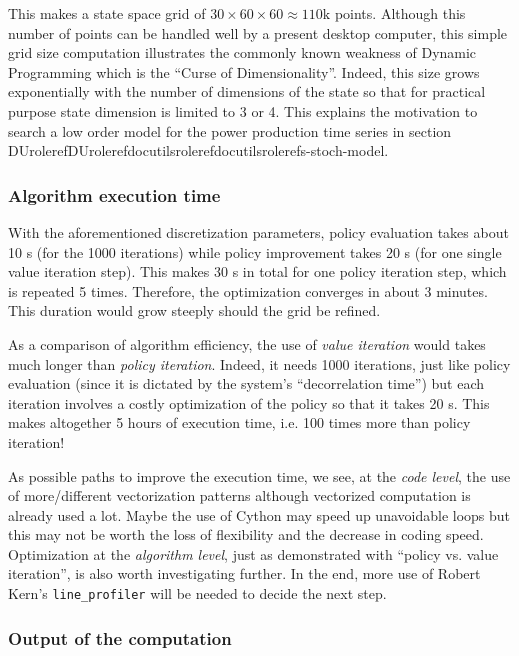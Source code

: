 \documentclass[letterpaper,compsoc,twoside]{IEEEtran}
\providecommand*{\DUrole}[2]{\ifcsname DUrole#1\endcsname \csname DUrole#1\endcsname{#2}\else \ifcsname docutilsrole#1\endcsname \csname docutilsrole#1\endcsname{#2}\else #2\fi \fi }
\begin{document}
This makes a state space grid of
$30\times 60 \times 60 \approx 110\text{k}$ points. Although this
number of points can be handled well by a present desktop computer, this
simple grid size computation illustrates the commonly known weakness of
Dynamic Programming which is the “Curse of Dimensionality”. Indeed, this
size grows exponentially with the number of dimensions of the state so
that for practical purpose state dimension is limited to 3 or 4. This
explains the motivation to search a low order model for the power
production time series in section \DUrole{ref}{s-stoch-model}.

\subsubsection{Algorithm execution time\label{algorithm-execution-time}}


With the aforementioned discretization parameters, policy evaluation
takes about 10 s (for the 1000 iterations) while policy improvement
takes 20 s (for one single value iteration step). This makes 30 s in
total for one policy iteration step, which is repeated 5 times.
Therefore, the optimization converges in about 3 minutes. This duration
would grow steeply should the grid be refined.

As a comparison of algorithm efficiency, the use of \emph{value iteration}
would takes much longer than \emph{policy iteration}. Indeed, it needs 1000
iterations, just like policy evaluation (since it is dictated by the
system’s “decorrelation time”) but each iteration involves a costly
optimization of the policy so that it takes 20 s. This makes altogether
5 hours of execution time, i.e. 100 times more than policy iteration!

As possible paths to improve the execution time, we see, at the \emph{code
level}, the use of more/different vectorization patterns although
vectorized computation is already used a lot. Maybe the use of Cython
may speed up unavoidable loops but this may not be worth the loss of
flexibility and the decrease in coding speed. Optimization at the
\emph{algorithm level}, just as demonstrated with “policy vs. value
iteration”, is also worth investigating further. In the end, more use of
Robert Kern’s \texttt{line\_profiler} will be needed to decide the next step.

\subsubsection{Output of the computation\label{output-of-the-computation}}
\end{document}

